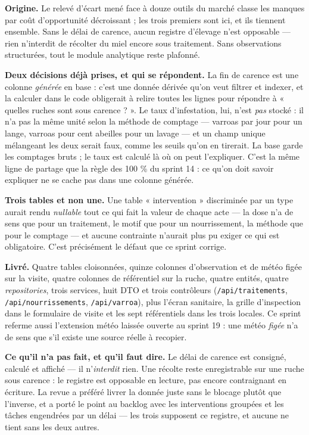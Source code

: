 \textbf{Origine.} Le relevé d'écart mené face à douze outils du marché classe les
manques par coût d'opportunité décroissant ; les trois premiers sont ici, et ils
tiennent ensemble. Sans le délai de carence, aucun registre d'élevage n'est
opposable --- rien n'interdit de récolter du miel encore sous traitement. Sans
observations structurées, tout le module analytique reste plafonné.

\textbf{Deux décisions déjà prises, et qui se répondent.} La fin de carence est
une colonne \emph{générée} en base : c'est une donnée dérivée qu'on veut filtrer
et indexer, et la calculer dans le code obligerait à relire toutes les lignes pour
répondre à « quelles ruches sont sous carence ? ». Le taux d'infestation, lui,
n'est \emph{pas} stocké : il n'a pas la même unité selon la méthode de comptage
--- varroas par jour pour un lange, varroas pour cent abeilles pour un lavage ---
et un champ unique mélangeant les deux serait faux, comme les seuils qu'on en
tirerait. La base garde les comptages bruts ; le taux est calculé là où on peut
l'expliquer. C'est la même ligne de partage que la règle des 100 \% du sprint 14 :
ce qu'on doit savoir expliquer ne se cache pas dans une colonne générée.

\textbf{Trois tables et non une.} Une table « intervention » discriminée par un
type aurait rendu \emph{nullable} tout ce qui fait la valeur de chaque acte --- la
dose n'a de sens que pour un traitement, le motif que pour un nourrissement, la
méthode que pour le comptage --- et aucune contrainte n'aurait plus pu exiger ce
qui est obligatoire. C'est précisément le défaut que ce sprint corrige.

\textbf{Livré.} Quatre tables cloisonnées, quinze colonnes d'observation et de
météo figée sur la visite, quatre colonnes de référentiel sur la ruche, quatre
entités, quatre \emph{repositories}, trois services, huit DTO et trois
contrôleurs (\texttt{/api/traitements}, \texttt{/api/nourrissements},
\texttt{/api/varroa}), plus l'écran sanitaire, la grille d'inspection dans le
formulaire de visite et les sept référentiels dans les trois locales. Ce sprint
referme aussi l'extension météo laissée ouverte au sprint 19 : une météo
\emph{figée} n'a de sens que s'il existe une source réelle à recopier.

\textbf{Ce qu'il n'a pas fait, et qu'il faut dire.} Le délai de carence est
consigné, calculé et affiché --- il n'\emph{interdit} rien. Une récolte reste
enregistrable sur une ruche sous carence : le registre est opposable en lecture,
pas encore contraignant en écriture. La revue a préféré livrer la donnée juste
sans le blocage plutôt que l'inverse, et a porté le point au backlog avec les
interventions groupées et les tâches engendrées par un délai --- les trois
supposent ce registre, et aucune ne tient sans les deux autres.


